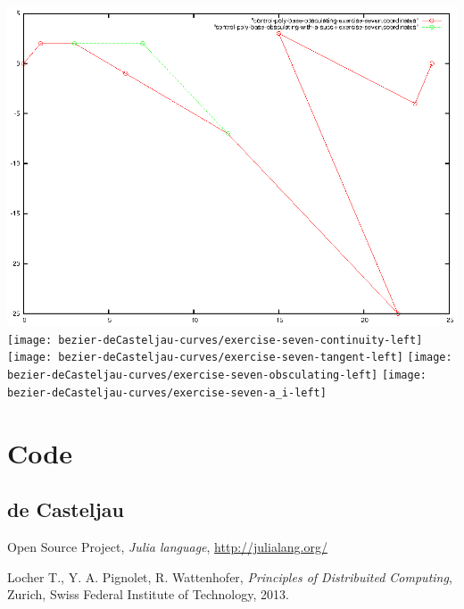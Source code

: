 \documentclass{article}
\begin{document}
\includegraphics{bezier-deCasteljau-curves/exercise-seven-a_succ_i}
\texttt{[image: bezier-deCasteljau-curves/exercise-seven-continuity-left]}
\texttt{[image: bezier-deCasteljau-curves/exercise-seven-tangent-left]}
\texttt{[image: bezier-deCasteljau-curves/exercise-seven-obsculating-left]}
\texttt{[image: bezier-deCasteljau-curves/exercise-seven-a\_i-left]}

\section{Code}
\subsection{de Casteljau}
\label{sec:deCasteljau-code}


\newpage

\begin{thebibliography}{}

 Open Source Project,
  \emph{Julia language}, \url{http://julialang.org/}

 Locher T., Y. A. Pignolet, R. Wattenhofer,
  \textit{Principles of Distribuited Computing}, Zurich, Swiss Federal
  Institute of Technology, 2013.


\end{thebibliography}
\end{document}
